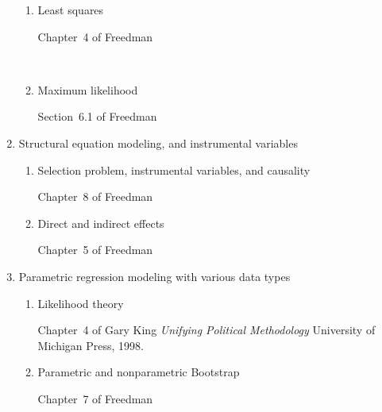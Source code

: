 \documentclass[11pt]{article}
\begin{document}
\begin{enumerate}
  \begin{enumerate}
  \item Least squares

    \begin{bibunit}[unsrtnat]
      \medskip Chapter~4 of Freedman 
      \putbib[my]
    \end{bibunit}    
     \\
    
  \item Maximum likelihood 

      \medskip Section~6.1 of Freedman 
      \medskip
    
  \end{enumerate}

\item Structural equation modeling, and instrumental variables

  \begin{enumerate}
  \item Selection problem, instrumental variables, and causality

    \begin{bibunit}[unsrtnat]
      \medskip Chapter~8 of Freedman
      \nocite{angr:imbe:rubi:96} 
      \putbib[my]
    \end{bibunit}    
 
  \item Direct and indirect effects

    \begin{bibunit}[unsrtnat]
      \medskip Chapter~5 of Freedman
      \nocite{imai:keel:yama:10} 
      \putbib[imai]
    \end{bibunit}    

  \end{enumerate}

\item Parametric regression modeling with various data types
  \begin{enumerate}
  \item Likelihood theory

    \medskip Chapter~4 of Gary King {\it Unifying Political
      Methodology} University of Michigan Press, 1998.

  \item Parametric and nonparametric Bootstrap

    \begin{bibunit}[unsrtnat]
      \medskip Chapter~7 of Freedman \nocite{king:tomz:witt:00}
      \putbib[my]
    \end{bibunit}    


\end{enumerate}
\end{enumerate}
\end{document}
